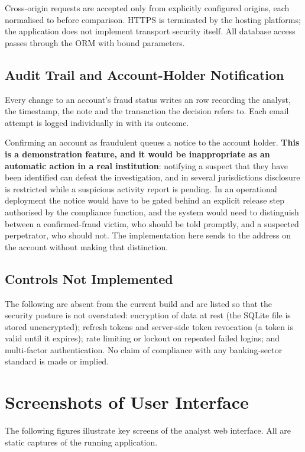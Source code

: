 Cross-origin requests are accepted only from explicitly configured origins, each normalised to  before comparison. HTTPS is terminated by the hosting platforms; the application does not implement transport security itself. All database access passes through the ORM with bound parameters.

\subsection{Audit Trail and Account-Holder Notification}
Every change to an account's fraud status writes an  row recording the analyst, the timestamp, the note and the transaction the decision refers to. Each email attempt is logged individually in  with its outcome.

Confirming an account as fraudulent queues a notice to the account holder. \textbf{This is a demonstration feature, and it would be inappropriate as an automatic action in a real institution}: notifying a suspect that they have been identified can defeat the investigation, and in several jurisdictions disclosure is restricted while a suspicious activity report is pending. In an operational deployment the notice would have to be gated behind an explicit release step authorised by the compliance function, and the system would need to distinguish between a confirmed-fraud victim, who should be told promptly, and a suspected perpetrator, who should not. The implementation here sends to the address on the account without making that distinction.

\subsection{Controls Not Implemented}
The following are absent from the current build and are listed so that the security posture is not overstated: encryption of data at rest (the SQLite file is stored unencrypted); refresh tokens and server-side token revocation (a token is valid until it expires); rate limiting or lockout on repeated failed logins; and multi-factor authentication. No claim of compliance with any banking-sector standard is made or implied.

\section{Screenshots of User Interface}
The following figures illustrate key screens of the analyst web interface. All are static captures of the running application.

